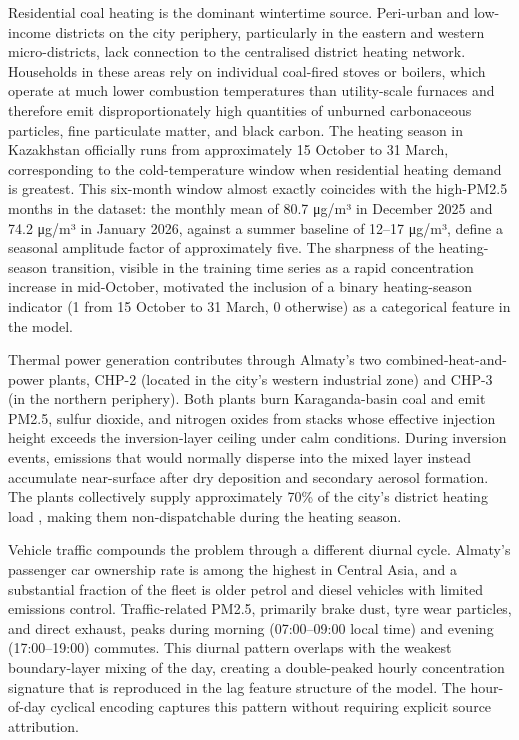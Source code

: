 Residential coal heating is the dominant wintertime source. Peri-urban and low-income districts on the city periphery, particularly in the eastern and western micro-districts, lack connection to the centralised district heating network. Households in these areas rely on individual coal-fired stoves or boilers, which operate at much lower combustion temperatures than utility-scale furnaces and therefore emit disproportionately high quantities of unburned carbonaceous particles, fine particulate matter, and black carbon. The heating season in Kazakhstan officially runs from approximately 15 October to 31 March, corresponding to the cold-temperature window when residential heating demand is greatest. This six-month window almost exactly coincides with the high-PM2.5 months in the dataset: the monthly mean of 80.7 μg/m³ in December 2025 and 74.2 μg/m³ in January 2026, against a summer baseline of 12--17 μg/m³, define a seasonal amplitude factor of approximately five. The sharpness of the heating-season transition, visible in the training time series as a rapid concentration increase in mid-October, motivated the inclusion of a binary heating-season indicator (1 from 15 October to 31 March, 0 otherwise) as a categorical feature in the model.

Thermal power generation contributes through Almaty's two combined-heat-and-power plants, CHP-2 (located in the city's western industrial zone) and CHP-3 (in the northern periphery). Both plants burn Karaganda-basin coal and emit PM2.5, sulfur dioxide, and nitrogen oxides from stacks whose effective injection height exceeds the inversion-layer ceiling under calm conditions. During inversion events, emissions that would normally disperse into the mixed layer instead accumulate near-surface after dry deposition and secondary aerosol formation. The plants collectively supply approximately 70\% of the city's district heating load \cite{WorldBank2022almaty}, making them non-dispatchable during the heating season.

Vehicle traffic compounds the problem through a different diurnal cycle. Almaty's passenger car ownership rate is among the highest in Central Asia, and a substantial fraction of the fleet is older petrol and diesel vehicles with limited emissions control. Traffic-related PM2.5, primarily brake dust, tyre wear particles, and direct exhaust, peaks during morning (07:00--09:00 local time) and evening (17:00--19:00) commutes. This diurnal pattern overlaps with the weakest boundary-layer mixing of the day, creating a double-peaked hourly concentration signature that is reproduced in the lag feature structure of the model. The hour-of-day cyclical encoding captures this pattern without requiring explicit source attribution.

